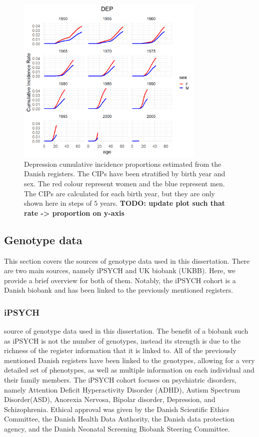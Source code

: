 \begin{figure}
	\includegraphics[width=9cm]{methods/prevalencePlot_DEP.png}
	\caption[Cumulative incidence proportions estimated from the Danish 
	Registers]{Depression cumulative incidence proportions estimated from the 
	Danish registers. The CIPs have been stratified by birth year and sex. The 
	red colour represent women and the blue represent men. The CIPs are 
	calculated for each birth year, but they are only shown here in steps of $ 
	5 $ years. \textbf{TODO: update plot such that rate -> proportion on y-axis}}
	\label{fig:CIP_DEP}
\end{figure}


\subsection{Genotype data}
This section covers the sources of genotype data used in this dissertation. There are two main sources, namely iPSYCH and UK biobank (UKBB). Here, we provide a brief overview for both of them. Notably, the iPSYCH cohort is a Danish biobank and has been linked to the previously mentioned registers. 


\subsubsection{iPSYCH}
source of genotype data used in this dissertation. The benefit of a biobank such as iPSYCH is not the number of genotypes, instead its strength is due to the richness of the register information that it is linked to. All of the previously mentioned Danish registers have been linked to the genotypes, allowing for a very detailed set of phenotypes, as well as multiple information on each individual and their family members. The iPSYCH cohort focuses on psychiatric disorders, namely Attention Deficit Hyperactivity Disorder (ADHD), Autism Spectrum Disorder(ASD), Anorexia Nervosa, Bipolar disorder, Depression, and Schizophrenia\cite{pedersen2018ipsych2012}. Ethical approval was given by the Danish Scientific Ethics Committee, the Danish Health Data Authority, the Danish data protection agency, and the Danish Neonatal Screening Biobank Steering Committee.

